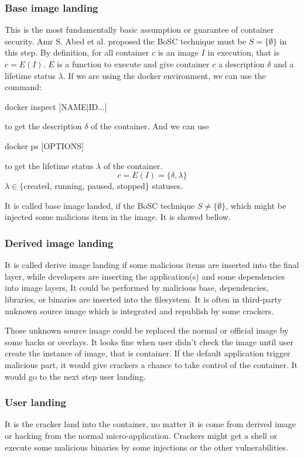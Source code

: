 \subsubsection{Base image landing}
This is the most fundamentally basic assumption or guarantee of container security. Amr S. Abed et al.
\cite{inproceedings} proposed the BoSC technique must be $S = \{\emptyset\}$ in this step. By definition, for all
container $c$ is an image $I$ in execution, that is  $c = E(I)$. $E$ is a function to execute and
give container $c$ a description $\delta$ and a lifetime status $\lambda$. If we are using the docker environment, we can use the command:
\begin{codebash}
    docker inspect [NAME|ID...]
\end{codebash}
to get the description $\delta$ of the container. And we can use
\begin{codebash}
    docker ps [OPTIONS]
\end{codebash}
to get the lifetime status $\lambda$ of the container.
$$c=E(I)=\{\delta, \lambda\}$$
$\lambda \in \{$created, running, paused, stopped$\}$ statuses.


It is called base image landed, if the BoSC technique $S \neq \{\emptyset\}$, which
might be injected some malicious item in the image. It is showed bellow.


\subsubsection{Derived image landing}
It is called derive image landing if some malicious items are inserted into the final layer,
while developers are inserting the application(s) and some dependencies into image layers,
It could be performed by malicious base, dependencies, libraries, or binaries are inserted
into the filesystem. It is often in third-party unknown source image which is integrated
and republish by some crackers.

Those unknown source image could be replaced the normal or official image by some hacks or overlays.
It looks fine when user didn't check the image until user create the instance of image, that is container.
If the default application trigger malicious part, it would give crackers a chance to take control of
the container. It would go to the next step user landing.

\subsubsection{User landing}
It is the cracker land into the container, no matter it is come from derived image or hacking from
the normal micro-application. Crackers might get a shell or execute some malicious binaries by
some injections or the other vulnerabilities.

